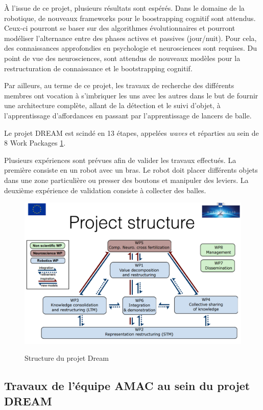 \documentclass[draft]{llncs}
\begin{document}
À l'issue de ce projet, plusieurs résultats sont espérés.
Dans le domaine de la robotique, de nouveaux frameworks pour le boostrapping cognitif sont attendus.
Ceux-ci pourront se baser sur des algorithmes évolutionnaires et pourront modéliser l'alternance entre des phases actives et passives (jour/nuit).
Pour cela, des connaissances approfondies en psychologie et neurosciences sont requises.
Du point de vue des neurosciences, sont attendus de nouveaux modèles pour la restructuration de connaissance et le bootstrapping cognitif.

Par ailleurs, au terme de ce projet, les travaux de recherche des différents membres ont vocation à s'imbriquer les uns avec les autres dans le but de fournir une architecture complète, allant de la détection et le suivi d'objet, à l'apprentissage d'affordances en passant par l'apprentissage de lancers de balle.

Le projet DREAM est scindé en 13 étapes, appelées \textit{waves} et réparties au sein de 8 Work Packages \ref{fig:dream}.

Plusieurs expériences sont prévues afin de valider les travaux effectués.
La première consiste en un robot avec un bras.
Le robot doit placer différents objets dans une zone particulière ou presser des boutons et manipuler des leviers. La deuxième expérience de validation consiste à collecter des balles.

\begin{figure}
	\centering
	\includegraphics[width=.8\textwidth]{figures/project_structure.png}
	\label{fig:dream}
	\caption{Structure du projet Dream}
\end{figure}






\subsection{Travaux de l'équipe AMAC au sein du projet DREAM}
\end{document}
